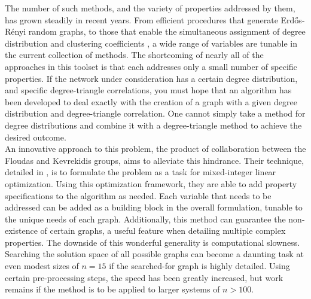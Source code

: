\documentclass[11pt]{article}
\begin{document}
\indent The number of such methods, and the variety of properties addressed by them, has grown steadily in recent years. From efficient procedures that generate Erd\H{o}s-R\'{e}nyi random graphs, to those that enable the simultaneous assignment of degree distribution and clustering coefficients \cite{Batagelj2005} \cite{Deijfen2009}, a wide range of variables are tunable in the current collection of methods. The shortcoming of nearly all of the approaches in this toolset is that each addresses only a small number of specific properties. If the network under consideration has a certain degree distribution, and specific degree-triangle correlations, you must hope that an algorithm has been developed to deal exactly with the creation of a graph with a given degree distribution and degree-triangle correlation. One cannot simply take a method for degree distributions and combine it with a degree-triangle method to achieve the desired outcome. \vspace{1mm}\\
\indent An innovative approach to this problem, the product of collaboration between the Floudas and Kevrekidis groups, aims to alleviate this hindrance. Their technique, detailed in \cite{Gounaris2013}, is to formulate the problem as a task for mixed-integer linear optimization. Using this optimization framework, they are able to add property specifications to the algorithm as needed. Each variable that needs to be addressed can be added as a building block in the overall formulation, tunable to the unique needs of each graph. Additionally, this method can guarantee the non-existence of certain graphs, a useful feature when detailing multiple complex properties. The downside of this wonderful generality is computational slowness. Searching the solution space of all possible graphs can become a daunting task at even modest sizes of $n=15$ if the searched-for graph is highly detailed. Using certain pre-processing steps, the speed has been greatly increased, but work remains if the method is to be applied to larger systems of $n>100$. 
\end{document}
